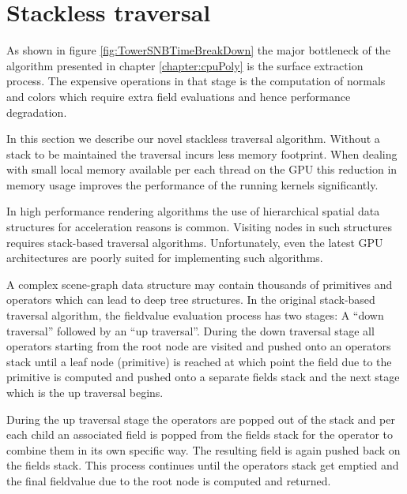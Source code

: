 \section{Stackless \blob traversal}
\label{sec:stackless}
As shown in figure \ref{fig:TowerSNBTimeBreakDown} the major bottleneck of the algorithm presented in chapter 
\ref{chapter:cpuPoly} is the surface extraction process. The expensive operations in that 
stage is the computation of normals and colors which require extra field evaluations and hence performance degradation. 

In this section we describe our novel stackless \blob traversal algorithm. 
Without a stack to be maintained the \blob traversal incurs less memory footprint. When dealing with small 
local memory available per each thread on the GPU this reduction in memory usage improves the performance of the 
running kernels significantly.

In high performance rendering algorithms the use of hierarchical spatial data structures for acceleration reasons 
is common. Visiting nodes in such structures requires stack-based traversal algorithms. Unfortunately, even the latest 
GPU architectures are poorly suited for implementing such algorithms. 

A complex \blob scene-graph data structure may contain thousands of primitives and operators which can lead to deep tree structures. 
In the original stack-based traversal algorithm, the fieldvalue evaluation process has two stages: A ``down traversal'' followed by an ``up traversal''. 
During the down traversal stage all operators starting from the root node are visited and pushed onto an operators stack until a leaf node (primitive) 
is reached at which point the field due to the primitive is computed and pushed onto a separate fields stack and the next 
stage which is the up traversal begins.

During the up traversal stage the operators are popped out of the stack and per each child an associated field is popped from the fields stack for the 
operator to combine them in its own specific way. The resulting field is again pushed back on the fields stack.  This process continues until the 
operators stack get emptied and the final fieldvalue due to the root node is computed and returned.

